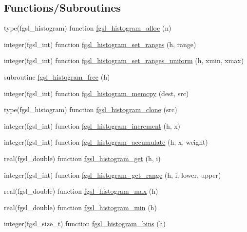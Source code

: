 \subsection*{Functions/\+Subroutines}
\begin{DoxyCompactItemize}
\item 
type(fgsl\+\_\+histogram) function \hyperlink{histogram_8finc_a75325ebef92592eba65abd29b6cfadc7}{fgsl\+\_\+histogram\+\_\+alloc} (n)
\item 
integer(fgsl\+\_\+int) function \hyperlink{histogram_8finc_a87bf68114579f570f3b87ec388c136ea}{fgsl\+\_\+histogram\+\_\+set\+\_\+ranges} (h, range)
\item 
integer(fgsl\+\_\+int) function \hyperlink{histogram_8finc_a258b134c27c43ac2108a948c55cf54b7}{fgsl\+\_\+histogram\+\_\+set\+\_\+ranges\+\_\+uniform} (h, xmin, xmax)
\item 
subroutine \hyperlink{histogram_8finc_a34c352dbcdd897703aee1a66777208fe}{fgsl\+\_\+histogram\+\_\+free} (h)
\item 
integer(fgsl\+\_\+int) function \hyperlink{histogram_8finc_a67a6d98e7d1b4186a4b56131eb87bc3c}{fgsl\+\_\+histogram\+\_\+memcpy} (dest, src)
\item 
type(fgsl\+\_\+histogram) function \hyperlink{histogram_8finc_a5a9a45aebea2e21a98f95a561bbc0efe}{fgsl\+\_\+histogram\+\_\+clone} (src)
\item 
integer(fgsl\+\_\+int) function \hyperlink{histogram_8finc_ae8981d30687002aad3dce8c9a029e230}{fgsl\+\_\+histogram\+\_\+increment} (h, x)
\item 
integer(fgsl\+\_\+int) function \hyperlink{histogram_8finc_ac400179f5587a3dbf384fedd0651f354}{fgsl\+\_\+histogram\+\_\+accumulate} (h, x, weight)
\item 
real(fgsl\+\_\+double) function \hyperlink{histogram_8finc_adce52371beeafdc26321bc2c1aa2fcea}{fgsl\+\_\+histogram\+\_\+get} (h, i)
\item 
integer(fgsl\+\_\+int) function \hyperlink{histogram_8finc_a8095fb527d62852e016fec06e1aeeffd}{fgsl\+\_\+histogram\+\_\+get\+\_\+range} (h, i, lower, upper)
\item 
real(fgsl\+\_\+double) function \hyperlink{histogram_8finc_a27016b45c9d32860d6bea50edb523b9a}{fgsl\+\_\+histogram\+\_\+max} (h)
\item 
real(fgsl\+\_\+double) function \hyperlink{histogram_8finc_a703b22dce40bb880886ebed5a1e25269}{fgsl\+\_\+histogram\+\_\+min} (h)
\item 
integer(fgsl\+\_\+size\+\_\+t) function \hyperlink{histogram_8finc_a106c810b7ef3935d89ea6a2fda4f9ac2}{fgsl\+\_\+histogram\+\_\+bins} (h)

\end{DoxyCompactItemize}

